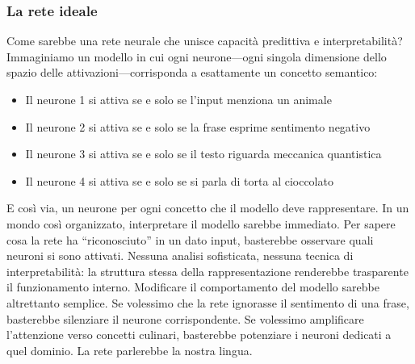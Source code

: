 \subsubsection{La rete ideale}
Come sarebbe una rete neurale che unisce capacità predittiva e interpretabilità? Immaginiamo un modello in cui ogni neurone—ogni singola dimensione dello spazio delle attivazioni—corrisponda a esattamente un concetto semantico:
\begin{itemize}
    \item Il neurone 1 si attiva se e solo se l'input menziona un animale
    \item Il neurone 2 si attiva se e solo se la frase esprime sentimento negativo
    \item Il neurone 3 si attiva se e solo se il testo riguarda meccanica quantistica
    \item Il neurone 4 si attiva se e solo se si parla di torta al cioccolato
\end{itemize}
E così via, un neurone per ogni concetto che il modello deve rappresentare.
In un mondo così organizzato, interpretare il modello sarebbe immediato. Per sapere cosa la rete ha ``riconosciuto'' in un dato input, basterebbe osservare quali neuroni si sono attivati. Nessuna analisi sofisticata, nessuna tecnica di interpretabilità: la struttura stessa della rappresentazione renderebbe trasparente il funzionamento interno.
Modificare il comportamento del modello sarebbe altrettanto semplice. Se volessimo che la rete ignorasse il sentimento di una frase, basterebbe silenziare il neurone corrispondente. Se volessimo amplificare l'attenzione verso concetti culinari, basterebbe potenziare i neuroni dedicati a quel dominio. La rete parlerebbe la nostra lingua.
